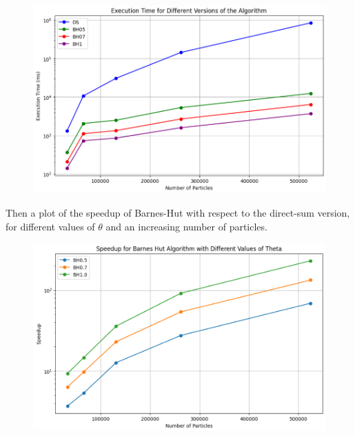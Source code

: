 \documentclass{article}
\begin{document}
\begin{figure} [h]
    \centering
    \includegraphics[width=1\textwidth]
    {images/execution_time_DS_BH.png}
    \label{fig:execution_time}
\end{figure}

\noindent Then a plot of the speedup of Barnes-Hut with respect to the direct-sum version, for different values of $\theta$ and an increasing number of particles.

\begin{figure} [h]
    \centering
    \includegraphics[width=1\textwidth]
    {images/BH_speedup.png}
    \label{fig:BH_speedup}
\end{figure}

\newpage
\end{document}

